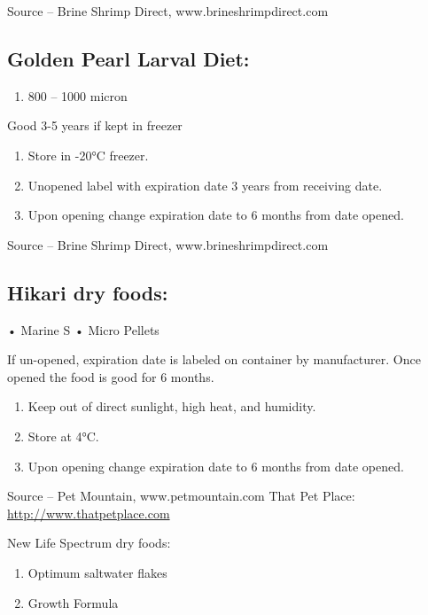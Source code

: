 \documentclass[
]{book}
\providecommand{\tightlist}{%
  \setlength{\itemsep}{0pt}\setlength{\parskip}{0pt}}
\begin{document}
Source -- Brine Shrimp Direct, www.brineshrimpdirect.com

\hypertarget{golden-pearl-larval-diet}{%
\subsection{Golden Pearl Larval Diet:}\label{golden-pearl-larval-diet}}

\begin{enumerate}
\def\labelenumi{\arabic{enumi}.}
\tightlist
\item
  800 -- 1000 micron
\end{enumerate}

Good 3-5 years if kept in freezer

\begin{enumerate}
\def\labelenumi{\arabic{enumi}.}
\tightlist
\item
  Store in -20°C freezer.
\item
  Unopened label with expiration date 3 years from receiving date.
\item
  Upon opening change expiration date to 6 months from date opened.
\end{enumerate}

Source -- Brine Shrimp Direct, www.brineshrimpdirect.com

\hypertarget{hikari-dry-foods}{%
\subsection{Hikari dry foods:}\label{hikari-dry-foods}}

• Marine S
• Micro Pellets

If un-opened, expiration date is labeled on container by manufacturer. Once opened the food is good for 6 months.

\begin{enumerate}
\def\labelenumi{\arabic{enumi}.}
\tightlist
\item
  Keep out of direct sunlight, high heat, and humidity.
\item
  Store at 4°C.
\item
  Upon opening change expiration date to 6 months from date opened.
\end{enumerate}

Source -- Pet Mountain, www.petmountain.com
That Pet Place: \url{http://www.thatpetplace.com}

New Life Spectrum dry foods:

\begin{enumerate}
\def\labelenumi{\arabic{enumi}.}
\setcounter{enumi}{1}
\tightlist
\item
  Optimum saltwater flakes
\item
  Growth Formula
\end{enumerate}
\end{document}
